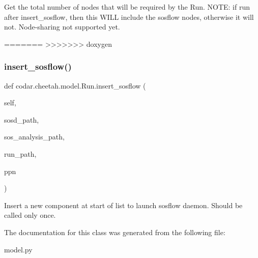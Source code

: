 \begin{DoxyVerb}Get the total number of nodes that will be required by the Run.
NOTE: if run after insert_sosflow, then this WILL include the sosflow
nodes, otherwise it will not. Node-sharing not supported yet.\end{DoxyVerb}
=======
>>>>>>> doxygen
 \mbox{\label{classcodar_1_1cheetah_1_1model_1_1_run_a8f4284bf79f8b909c4c2d0ef5319e3bc}} 
\subsubsection{\texorpdfstring{insert\+\_\+sosflow()}{insert\_sosflow()}}
{\footnotesize\ttfamily def codar.\+cheetah.\+model.\+Run.\+insert\+\_\+sosflow (\begin{DoxyParamCaption}\item[{}]{self,  }\item[{}]{sosd\+\_\+path,  }\item[{}]{sos\+\_\+analysis\+\_\+path,  }\item[{}]{run\+\_\+path,  }\item[{}]{ppn }\end{DoxyParamCaption})}

\begin{DoxyVerb}Insert a new component at start of list to launch sosflow daemon.
Should be called only once.\end{DoxyVerb}
 

The documentation for this class was generated from the following file\+:\begin{DoxyCompactItemize}
\item 
model.\+py\end{DoxyCompactItemize}
